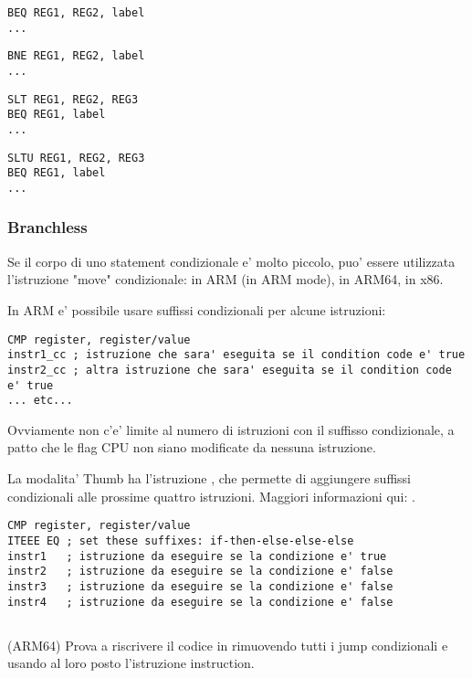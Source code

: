 \begin{lstlisting}[caption=Check for equal values]
BEQ REG1, REG2, label
...
\end{lstlisting}

\begin{lstlisting}[caption=Check for non-equal values]
BNE REG1, REG2, label
...
\end{lstlisting}

\begin{lstlisting}[caption=Check for less than{,} greater than (signed)]
SLT REG1, REG2, REG3
BEQ REG1, label
...
\end{lstlisting}

\begin{lstlisting}[caption=Check for less than{,} greater than (unsigned)]
SLTU REG1, REG2, REG3
BEQ REG1, label
...
\end{lstlisting}

\subsubsection{Branchless}

Se il corpo di uno statement condizionale e' molto piccolo, puo' essere utilizzata l'istruzione "move" condizionale: 
 in ARM (in ARM mode),  in ARM64,  in x86.


In ARM e' possibile usare suffissi condizionali per alcune istruzioni:

\begin{lstlisting}[caption=ARM (\ARMMode)]
CMP register, register/value
instr1_cc ; istruzione che sara' eseguita se il condition code e' true
instr2_cc ; altra istruzione che sara' eseguita se il condition code e' true
... etc...
\end{lstlisting}

Ovviamente non c'e' limite al numero di istruzioni con il suffisso condizionale, a patto che le flag CPU non siano modificate da nessuna istruzione. 


La modalita' Thumb ha l'istruzione , che permette di aggiungere suffissi condizionali alle prossime quattro istruzioni.
Maggiori informazioni qui: .

\begin{lstlisting}[caption=ARM (\ThumbMode)]
CMP register, register/value
ITEEE EQ ; set these suffixes: if-then-else-else-else
instr1   ; istruzione da eseguire se la condizione e' true
instr2   ; istruzione da eseguire se la condizione e' false
instr3   ; istruzione da eseguire se la condizione e' false
instr4   ; istruzione da eseguire se la condizione e' false
\end{lstlisting}

\subsection{\Esercizio}

(ARM64) Prova a riscrivere il codice in  rimuovendo tutti i jump condizionali e usando al loro posto l'istruzione  instruction.
